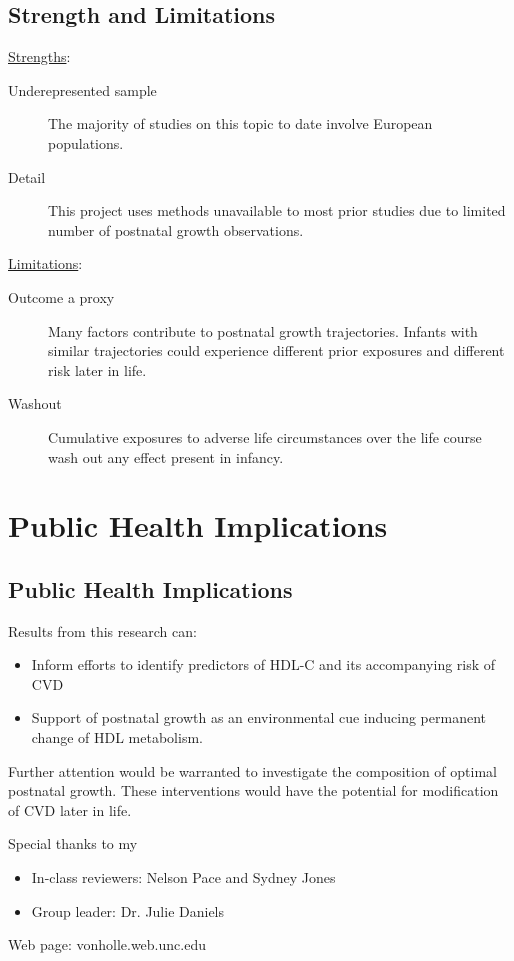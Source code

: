 \documentclass[10pt]{beamer}\usepackage[]{graphicx}\usepackage[]{color}
\begin{document}
\subsection{Strength and Limitations}
\begin{frame}

\underline{Strengths}:
\begin{description}
	\item[Underepresented sample] The majority of studies on this topic to date involve European populations.
	\item[Detail] This project uses methods unavailable to most prior studies due to limited number of postnatal growth observations.
	\end{description}
	
\underline{Limitations}:
\begin{description}
	\item[Outcome a proxy] Many factors contribute to postnatal growth trajectories. Infants with similar trajectories could experience different prior exposures and different risk later in life.
	\item[Washout] Cumulative exposures to adverse life circumstances over the life course wash out any effect present in infancy.
	\end{description}
\end{frame}

\section{Public Health Implications}
\subsection{Public Health Implications}
\begin{frame}
Results from this research can:
\begin{itemize}
\item Inform efforts to identify predictors of HDL-C and its accompanying risk of CVD
\item Support of postnatal growth as an environmental cue inducing permanent change of HDL metabolism. 
\end{itemize}

\mediumskip
Further attention would be warranted to investigate the composition of optimal postnatal growth. These interventions would have the potential for modification of CVD later in life.

\end{frame}

\begin{frame}
Special thanks to my
\begin{itemize}
	\item In-class reviewers: Nelson Pace and Sydney Jones
	\item Group leader: Dr. Julie Daniels
	\end{itemize}
	
	Web page: vonholle.web.unc.edu
\end{frame}
\end{document}
